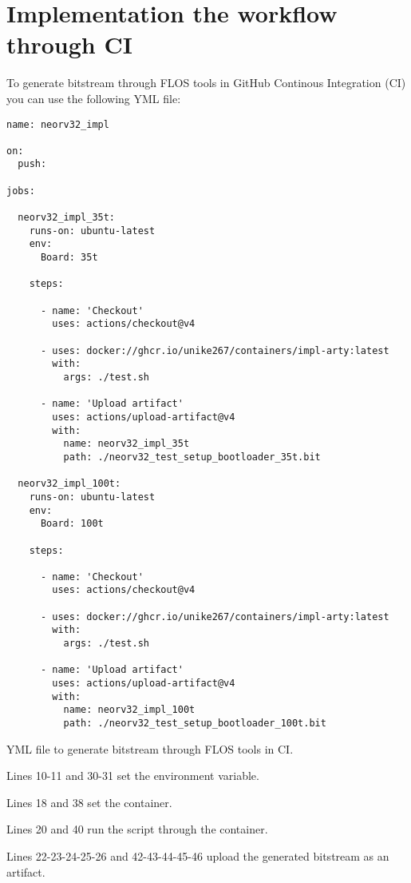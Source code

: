 \section{Implementation the workflow through CI}

\label{ci}

To generate bitstream through FLOS tools in GitHub Continous Integration (CI) you can use the following YML file:

\begin{code}
\begin{verbatim}
name: neorv32_impl

on:
  push:

jobs:

  neorv32_impl_35t:
    runs-on: ubuntu-latest
    env:
      Board: 35t

    steps:

      - name: 'Checkout'
        uses: actions/checkout@v4

      - uses: docker://ghcr.io/unike267/containers/impl-arty:latest
        with:
          args: ./test.sh
      
      - name: 'Upload artifact'
        uses: actions/upload-artifact@v4
        with:
          name: neorv32_impl_35t
          path: ./neorv32_test_setup_bootloader_35t.bit

  neorv32_impl_100t:
    runs-on: ubuntu-latest
    env:
      Board: 100t

    steps:

      - name: 'Checkout'
        uses: actions/checkout@v4

      - uses: docker://ghcr.io/unike267/containers/impl-arty:latest
        with:
          args: ./test.sh
      
      - name: 'Upload artifact'
        uses: actions/upload-artifact@v4
        with:
          name: neorv32_impl_100t
          path: ./neorv32_test_setup_bootloader_100t.bit
\end{verbatim}
\caption{YML file to generate bitstream through FLOS tools in CI.}
\label{cod:7}
\end{code}

\vspace{5mm}

\noindent Lines 10-11 and 30-31 set the environment variable.

\vspace{5mm}

\noindent Lines 18 and 38 set the container.

\vspace{5mm}

\noindent Lines 20 and 40 run the script through the container.


\vspace{5mm}

\noindent Lines 22-23-24-25-26 and 42-43-44-45-46 upload the generated bitstream as an artifact.

